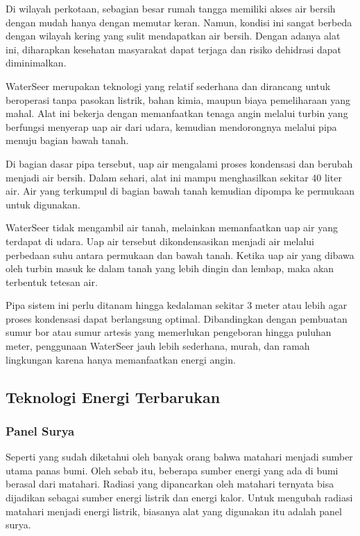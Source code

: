 \documentclass[../wastek.tex]{subfiles}
\begin{document}
Di wilayah perkotaan, sebagian besar rumah tangga memiliki akses air bersih dengan mudah hanya dengan memutar keran. Namun, kondisi ini sangat berbeda dengan wilayah kering yang sulit mendapatkan air bersih. Dengan adanya alat ini, diharapkan kesehatan masyarakat dapat terjaga dan risiko dehidrasi dapat diminimalkan.

WaterSeer merupakan teknologi yang relatif sederhana dan dirancang untuk beroperasi tanpa pasokan listrik, bahan kimia, maupun biaya pemeliharaan yang mahal. Alat ini bekerja dengan memanfaatkan tenaga angin melalui turbin yang berfungsi menyerap uap air dari udara, kemudian mendorongnya melalui pipa menuju bagian bawah tanah.

Di bagian dasar pipa tersebut, uap air mengalami proses kondensasi dan berubah menjadi air bersih. Dalam sehari, alat ini mampu menghasilkan sekitar 40 liter air. Air yang terkumpul di bagian bawah tanah kemudian dipompa ke permukaan untuk digunakan.

WaterSeer tidak mengambil air tanah, melainkan memanfaatkan uap air yang terdapat di udara. Uap air tersebut dikondensasikan menjadi air melalui perbedaan suhu antara permukaan dan bawah tanah. Ketika uap air yang dibawa oleh turbin masuk ke dalam tanah yang lebih dingin dan lembap, maka akan terbentuk tetesan air.

Pipa sistem ini perlu ditanam hingga kedalaman sekitar 3 meter atau lebih agar proses kondensasi dapat berlangsung optimal. Dibandingkan dengan pembuatan sumur bor atau sumur artesis yang memerlukan pengeboran hingga puluhan meter, penggunaan WaterSeer jauh lebih sederhana, murah, dan ramah lingkungan karena hanya memanfaatkan energi angin.

\subsection{Teknologi Energi Terbarukan}%
\label{sub:teknologi_energi_terbarukan}

\subsubsection{Panel Surya}%
\label{ssub:panel_surya}

Seperti yang sudah diketahui oleh banyak orang bahwa matahari menjadi sumber utama panas bumi. Oleh sebab itu, beberapa sumber energi yang ada di bumi berasal dari matahari. Radiasi yang dipancarkan oleh matahari ternyata bisa dijadikan sebagai sumber energi listrik dan energi kalor. Untuk mengubah radiasi matahari menjadi energi listrik, biasanya alat yang digunakan itu adalah panel surya.
\end{document}
